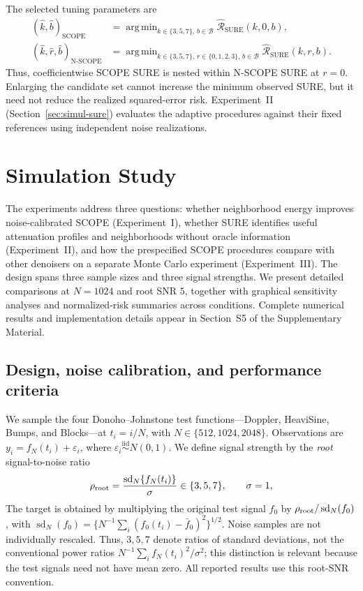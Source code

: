 \documentclass[12pt]{article}
\theoremstyle{definition}
\theoremstyle{definition}
\DeclareMathOperator{\sd}{sd}
\DeclareMathOperator*{\argmin}{arg\,min}
\begin{document}
The selected tuning parameters are
\begin{align}
(\widehat k,\widehat b)_{\mathrm{SCOPE}}
 &= \argmin_{k\in\{3,5,7\},\,b\in\mathcal B}
     \widehat{\mathcal R}_{\mathrm{SURE}}(k,0,b),\nonumber\\
(\widehat k,\widehat r,\widehat b)_{\text{N-SCOPE}}
 &= \argmin_{k\in\{3,5,7\},\,r\in\{0,1,2,3\},\,b\in\mathcal B}
     \widehat{\mathcal R}_{\mathrm{SURE}}(k,r,b).
\label{eq:cal-sure-select}
\end{align}
Thus, coefficientwise SCOPE SURE is nested within N-SCOPE SURE at
$r=0$. Enlarging the candidate set cannot increase the minimum
observed SURE, but it need not reduce the realized squared-error
risk. Experiment~II (Section~\ref{sec:simul-sure}) evaluates the
adaptive procedures against their fixed references using independent
noise realizations.

\section{Simulation Study}
\label{sec:simul}

The experiments address three questions: whether neighborhood energy
improves noise-calibrated SCOPE (Experiment~I), whether SURE identifies
useful attenuation profiles and neighborhoods without oracle
information (Experiment~II), and how the prespecified SCOPE procedures
compare with other denoisers on a separate Monte Carlo experiment
(Experiment~III). The design spans three sample sizes and three
signal strengths. We present detailed comparisons at $N=1024$ and
root SNR $5$, together with graphical sensitivity analyses and
normalized-risk summaries across conditions. Complete numerical
results and implementation details appear in Section~S5 of the
Supplementary Material.

\subsection{Design, noise calibration, and performance criteria}
\label{sec:simul-design}

We sample the four Donoho--Johnstone test functions---Doppler,
HeaviSine, Bumps, and Blocks---at $t_i=i/N$, with
$N\in\{512,1024,2048\}$. Observations are
$y_i=f_N(t_i)+\varepsilon_i$, where
$\varepsilon_i\stackrel{\mathrm{iid}}{\sim}N(0,1)$.
We define signal strength by the \emph{root} signal-to-noise ratio
\begin{equation}
\rho_{\rm root} = \frac{\sd_N\{f_N(t_i)\}}{\sigma}
\in\{3,5,7\}, \qquad \sigma=1,
\label{eq:simul-root-snr}
\end{equation}
The target is obtained by multiplying the original test signal
$f_0$ by $\rho_{\rm root}/\sd_N(f_0)$, with
$\sd_N(f_0)=\{N^{-1}\sum_i(f_0(t_i)-\bar f_0)^2\}^{1/2}$.
Noise samples are not individually rescaled. Thus, $3,5,7$ denote
ratios of standard deviations, not the conventional power ratios
$N^{-1}\sum_i f_N(t_i)^2/\sigma^2$; this distinction is relevant
because the test signals need not have mean zero. All reported
results use this root-SNR convention.
\end{document}
